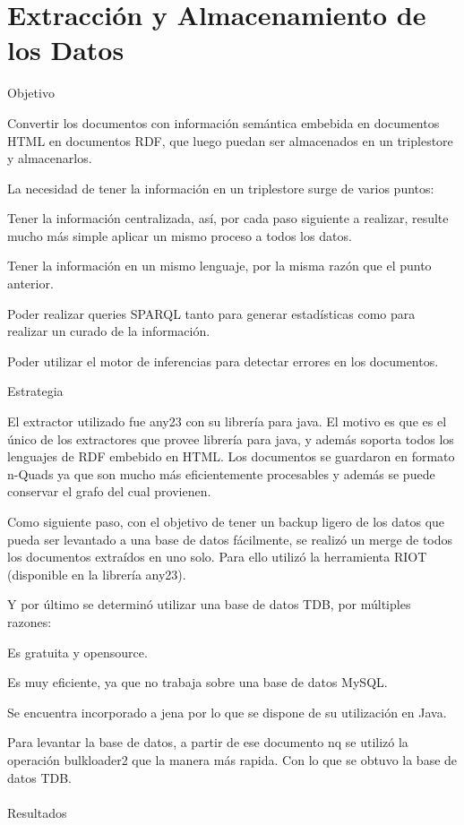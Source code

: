 \chapter{Extracción y Almacenamiento de los Datos}
\label{chapter:extraccion}

Objetivo

Convertir los documentos con información semántica embebida en documentos HTML en documentos RDF, que luego puedan ser 
almacenados en un triplestore y almacenarlos.

La necesidad de tener la información en un triplestore surge de varios puntos:

Tener la información centralizada, así, por cada paso siguiente a realizar, resulte mucho más simple aplicar un mismo proceso a todos los datos.

Tener la información en un mismo lenguaje, por la misma razón que el punto anterior.

Poder realizar queries SPARQL tanto para generar estadísticas como para realizar un curado de la información.

Poder utilizar el motor de inferencias para detectar errores en los documentos.

Estrategia

El extractor utilizado fue any23 con su librería para java. El motivo es que es el único de los extractores que provee librería para java, y además soporta todos los lenguajes de RDF embebido en HTML.
Los documentos se guardaron en formato n-Quads ya que son mucho más eficientemente procesables y además se puede conservar el grafo del cual provienen.

Como siguiente paso, con el objetivo de tener un backup ligero de los datos que pueda ser levantado a una base de datos fácilmente, se realizó un merge de todos los documentos extraídos en uno solo.
Para ello utilizó la herramienta RIOT (disponible en la librería any23).

Y por último se determinó utilizar una base de datos TDB, por múltiples razones:

Es gratuita y opensource. 

Es muy eficiente, ya que no trabaja sobre una base de datos MySQL.

Se encuentra incorporado a jena por lo que se dispone de su utilización en Java.

Para levantar la base de datos, a partir de ese documento nq se utilizó la operación bulkloader2 que la manera más rapida. Con lo que se obtuvo la base de datos TDB.
\\
\\
Resultados

